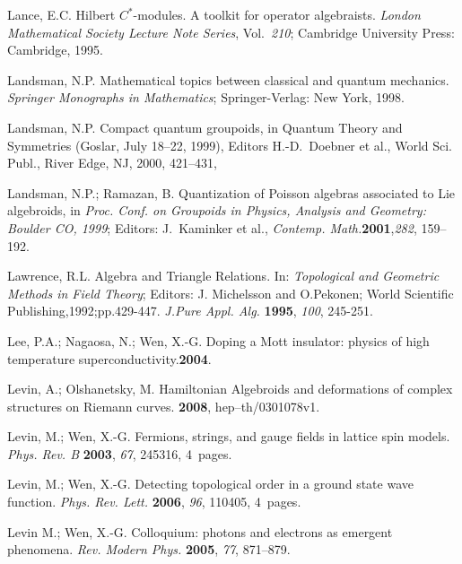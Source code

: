 \documentclass[12pt]{article}
\theoremstyle{plain}
\theoremstyle{definition}
\numberwithin{equation}{section}
\begin{document}
\begin{thebibliography}{99}
Lance, E.C. Hilbert $C^*$-modules. A toolkit for operator algebraists. {\em London Mathematical Society Lecture Note Series}, Vol.~{\em 210}; Cambridge University Press: Cambridge, 1995.

Landsman, N.P. Mathematical topics between classical and quantum mechanics. {\em Springer Monographs in Mathematics}; Springer-Verlag: New York, 1998.

Landsman, N.P. Compact quantum groupoids, in Quantum Theory and Symmetries (Goslar, July 18--22, 1999), Editors H.-D.~Doebner et al., World Sci. Publ., River Edge, NJ, 2000, 421--431,

Landsman, N.P.; Ramazan, B. Quantization of Poisson algebras associated to Lie algebroids, in {\em Proc. Conf. on Groupoids in Physics, Analysis and Geometry: Boulder CO, 1999}; Editors: J.~Kaminker et al., \emph{Contemp. Math.}{\bf 2001},{\em 282}, 159--192.

Lawrence, R.L. Algebra and Triangle Relations. In: {\em Topological and Geometric Methods in Field Theory}; Editors: J. Michelsson and O.Pekonen; World Scientific Publishing,1992;pp.429-447. {\em J.Pure Appl. Alg.} {\bf 1995}, {\em 100}, 245-251.

Lee, P.A.; Nagaosa, N.; Wen, X.-G. Doping a Mott insulator: physics of high temperature superconductivity.{\bf 2004}.

Levin, A.; Olshanetsky, M. Hamiltonian Algebroids and deformations of complex structures on Riemann curves. {\bf 2008}, hep--th/0301078v1.

Levin, M.; Wen, X.-G. Fermions, strings, and gauge fields in lattice spin models. {\em Phys. Rev. B} {\bf 2003}, {\em 67}, 245316, 4~pages. %

Levin, M.; Wen, X.-G. Detecting topological order in a ground state wave function. {\em Phys. Rev. Lett.} {\bf 2006}, {\em 96}, 110405, 4~pages. %

Levin M.; Wen, X.-G. Colloquium: photons and electrons as emergent phenomena. {\em Rev. Modern Phys.} {\bf 2005}, {\em 77}, 871--879. %


\end{thebibliography}
\end{document}
